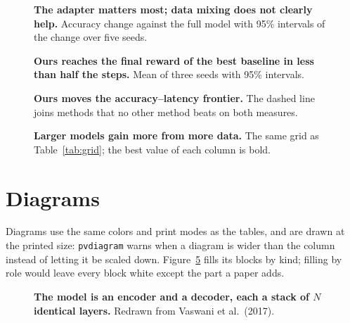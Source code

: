 \begin{figure}[t]
  \centering
  \caption{\textbf{The adapter matters most; data mixing does not clearly help.}
    Accuracy change against the full model with 95\% intervals of the
    change over five seeds.}
  \label{fig:deltas}
\end{figure}

\begin{figure}[t]
  \centering
  \caption{\textbf{Ours reaches the final reward of the best baseline in
    less than half the steps.} Mean of three seeds with 95\% intervals.}
  \label{fig:curves}
\end{figure}

\begin{figure}[t]
  \centering
  \caption{\textbf{Ours moves the accuracy--latency frontier.} The dashed
    line joins methods that no other method beats on both measures.}
  \label{fig:tradeoff}
\end{figure}

\begin{figure}[t]
  \centering
  \caption{\textbf{Larger models gain more from more data.} The same grid as
    Table~\ref{tab:grid}; the best value of each column is bold.}
  \label{fig:heatmap}
\end{figure}

\section{Diagrams}

Diagrams use the same colors and print modes as the tables, and are drawn at
the printed size: \texttt{pvdiagram} warns when a diagram is wider than the
column instead of letting it be scaled down. Figure~\ref{fig:transformer}
fills its blocks by kind; filling by role would leave every block white
except the part a paper adds.


\begin{figure}[t]
  \centering
  \transformer
  \caption{\textbf{The model is an encoder and a decoder, each a stack of
    $N$ identical layers.} Redrawn from Vaswani et al.\ (2017).}
  \label{fig:transformer}
\end{figure}

